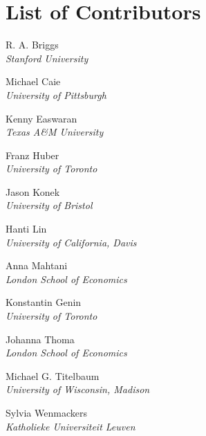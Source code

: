 
\bigskip

\begingroup
\let\clearpage\relax
\let\cleardoublepage\relax
\let\cleardoublepage\relax
\chapter*{List of Contributors}

\noindent R. A. Briggs\\
{\itshape Stanford University}
\setlength{\parskip}{\baselineskip}

\noindent Michael Caie\\
{\itshape University of Pittsburgh}

\noindent Kenny Easwaran\\
{\itshape Texas A\&M University}

\noindent Franz Huber\\
{\itshape University of Toronto}

\noindent Jason Konek\\
{\itshape University of Bristol}

\noindent Hanti Lin\\
{\itshape University of California, Davis}

\noindent Anna Mahtani\\
{\itshape London School of Economics}

\noindent Konstantin Genin\\
{\itshape University of Toronto}

\noindent Johanna Thoma\\
{\itshape London School of Economics}

\noindent Michael G. Titelbaum\\
{\itshape University of Wisconsin, Madison}

\noindent Sylvia Wenmackers\\
{\itshape Katholieke Universiteit Leuven}

\endgroup
